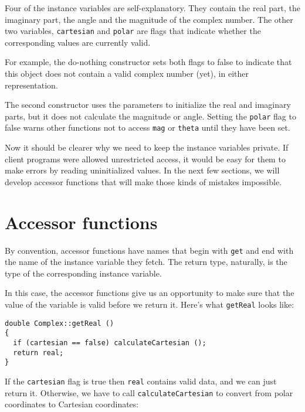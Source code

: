 
Four of the instance variables are self-explanatory.  They
contain the real part, the imaginary part, the angle and
the magnitude of the complex number.  The other two
variables, {\tt cartesian} and {\tt polar} are flags that
indicate whether the corresponding values are currently
valid.


For example, the do-nothing constructor sets both flags
to false to indicate that this object does not contain
a valid complex number (yet), in either representation.

The second constructor uses the parameters to initialize
the real and imaginary parts, but it does not calculate the
magnitude or angle.  Setting the {\tt polar} flag to false
warns other functions not to access {\tt mag} or {\tt theta}
until they have been set.

Now it should be clearer why we need to keep the instance
variables private.  If client programs were allowed unrestricted
access, it would be easy for them to make errors by reading
uninitialized values.  In the next few sections, we will
develop accessor functions that will make those kinds of mistakes
impossible.

\section{Accessor functions}

By convention, accessor functions have names that
begin with {\tt get} and end with the name of the instance
variable they fetch.  The return type, naturally, is the type
of the corresponding instance variable.


In this case, the accessor functions give us an opportunity
to make sure that the value of the variable is valid before
we return it.  Here's what {\tt getReal} looks like:

\begin{verbatim}
double Complex::getReal ()
{
  if (cartesian == false) calculateCartesian ();
  return real;
}
\end{verbatim}
%
If the {\tt cartesian} flag is true then {\tt real} contains
valid data, and we can just return it.  Otherwise, we have
to call {\tt calculateCartesian} to convert from polar coordinates
to Cartesian coordinates:

